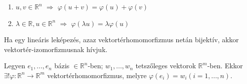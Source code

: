 \begin{frame}
\begin{tcolorbox}[title={Def.: Vektortérhomomorfizmus, Vektortérizomorfizmus}]
 			\begin{enumerate}
 			\item $u, v \in \mathbb{R}^n$ $\Rightarrow$ $\varphi(u + v) = \varphi(u) + \varphi(v)$
			\item ${\lambda} \in \mathbb{R}, u \in \mathbb{R}^n$ $\Rightarrow$ ${\varphi}({\lambda}u) = {\lambda}{\varphi}(u)$
 			\end{enumerate}

			Ha egy lineáris leképezés, azaz vektortérhomomorfizmus netán bijektív, akkor vektortér-izomorfizmusnak hívjuk.
		\end{tcolorbox}	
		
		\begin{tcolorbox}[title={Tétel: Egyértelmű kiterjesztés tétel}]
 			Legyen $e_1, ..., e_n$ bázis $\in \mathbb{R}^n$-ben; $w_1, ..., w_n$ tetszőleges vektorok $\mathbb{R}^m$-ben. Ekkor ${\exists}!{\varphi} : \mathbb{R}^n \rightarrow \mathbb{R}^m$ vektortérhomomorfizmus, melyre $\varphi(e_i) = w_i (i = 1, ..., n)$.
		\end{tcolorbox}	
	\end{frame}
	
	
	
